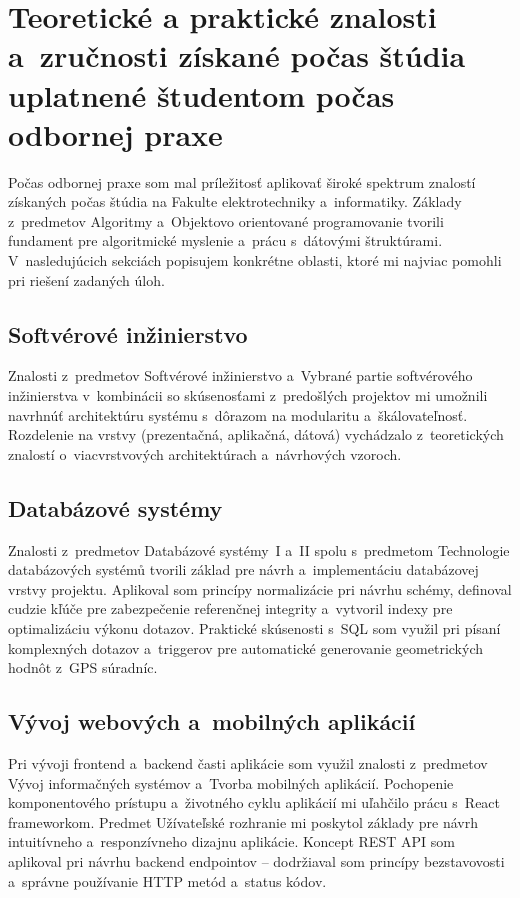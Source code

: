 \chapter[Teoretické a praktické znalosti uplatnené počas praxe]{Teoretické a praktické znalosti a~zručnosti získané počas štúdia uplatnené študentom počas odbornej praxe}
\label{sec:Znalosti}

Počas odbornej praxe som mal príležitosť aplikovať široké spektrum znalostí získaných počas štúdia na Fakulte elektrotechniky a~informatiky. Základy z~predmetov Algoritmy a~Objektovo orientované programovanie tvorili fundament pre algoritmické myslenie a~prácu s~dátovými štruktúrami. V~nasledujúcich sekciách popisujem konkrétne oblasti, ktoré mi najviac pomohli pri riešení zadaných úloh.

\section{Softvérové inžinierstvo}
\label{sec:ZnalostSWI}

Znalosti z~predmetov Softvérové inžinierstvo a~Vybrané partie softvérového inžinierstva v~kombinácii so skúsenosťami z~predošlých projektov mi umožnili navrhnúť architektúru systému s~dôrazom na modularitu a~škálovateľnosť. Rozdelenie na vrstvy (prezentačná, aplikačná, dátová) vychádzalo z~teoretických znalostí o~viacvrstvových architektúrach a~návrhových vzoroch.

\section{Databázové systémy}
\label{sec:ZnalostDB}

Znalosti z~predmetov Databázové systémy~I a~II spolu s~predmetom Technologie databázových systémů tvorili základ pre návrh a~implementáciu databázovej vrstvy projektu. Aplikoval som princípy normalizácie pri návrhu schémy, definoval cudzie kľúče pre zabezpečenie referenčnej integrity a~vytvoril indexy pre optimalizáciu výkonu dotazov. Praktické skúsenosti s~SQL som využil pri písaní komplexných dotazov a~triggerov pre automatické generovanie geometrických hodnôt z~GPS súradníc.

\section{Vývoj webových a~mobilných aplikácií}
\label{sec:ZnalostWeb}

Pri vývoji frontend a~backend časti aplikácie som využil znalosti z~predmetov Vývoj informačných systémov a~Tvorba mobilných aplikácií. Pochopenie komponentového prístupu a~životného cyklu aplikácií mi uľahčilo prácu s~React frameworkom. Predmet Užívateľské rozhranie mi poskytol základy pre návrh intuitívneho a~responzívneho dizajnu aplikácie. Koncept REST API som aplikoval pri návrhu backend endpointov -- dodržiaval som princípy bezstavovosti a~správne používanie HTTP metód a~status kódov.

